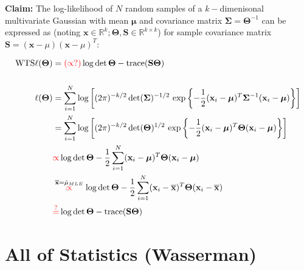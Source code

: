 \documentclass[11pt]{article}
\begin{document}
{\bf Claim:} The log-likelihood of $N$ random samples of a $k-$dimenisonal multivariate Gaussian with mean $\boldsymbol\mu$ and covariance matrix $\boldsymbol\Sigma = \boldsymbol\Theta^{-1}$ can be expressed as (noting $\mathbf{x} \in \mathbb{R}^k; \boldsymbol\Theta, \mathbf{S} \in \mathbb{R}^{k \times k}$) for sample covariance matrix $\mathbf{S} =  (\mathbf{x}-\mu)(\mathbf{x}-\mu)^T$:

\begin{align*}
    \text{WTS}
    \ell(\boldsymbol\Theta)
    &= \textcolor{red}{(\propto?)}
    \log \det \boldsymbol\Theta
    -
    \text{trace}(\mathbf{S}\boldsymbol\Theta )
    \\
    \\
    \ell(\boldsymbol\Theta)
    &= 
    \sum_{i=1}^N
    \log\left[
    (2\pi)^{-k/2} 
    \det(\boldsymbol\Sigma)^{-1/2}
    \ \text{exp}\left\{ 
    -\frac{1}{2}
    (\mathbf{x}_i-\boldsymbol\mu)^T
    \boldsymbol\Sigma^{-1}
    (\mathbf{x}_i-\boldsymbol\mu)
     \right\}
    \right]
\\
    &= 
    \sum_{i=1}^N
    \log\left[
    (2\pi)^{-k/2} 
    \det(\boldsymbol\Theta)^{1/2}
    \ \text{exp}\left\{ 
    -\frac{1}{2}
    (\mathbf{x}_i-\boldsymbol\mu)^T
    \boldsymbol\Theta
    (\mathbf{x}_i-\boldsymbol\mu)
     \right\}
    \right]   
\\
    &\textcolor{red}{\propto}
    \log \det \boldsymbol\Theta 
    -\frac{1}{2}
    \sum_{i=1}^N
    (\mathbf{x}_i-\boldsymbol\mu)^T
    \boldsymbol\Theta 
    (\mathbf{x}_i-\boldsymbol\mu)    
\\
    &
    \stackrel{
    \overline{\mathbf{x}} = \hat{\mu}_{MLE}
    }
    {
    \textcolor{red}{\propto}
    }
    \log \det \boldsymbol\Theta 
    -
    \frac{1}{2}
    \sum_{i=1}^N
    (\mathbf{x}_i-\overline{\mathbf{x}})^T
    \boldsymbol\Theta 
    (\mathbf{x}_i-\overline{\mathbf{x}})   
\\
    &\textcolor{red}{\stackrel{?}{=}}
    \log \det \boldsymbol\Theta 
    -
    \text{trace}(\mathbf{S}\boldsymbol\Theta) 
\end{align*}

\newpage 
\begin{tcolorbox}
\vspace{4mm}
\bf \LARGE \chapter{All of Statistics (Wasserman)} 
\vspace{4mm}
\end{tcolorbox}
\end{document}
